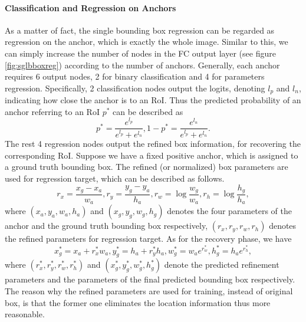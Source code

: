 \paragraph{Classification and Regression on Anchors}
As a matter of fact, the single bounding box regression can be regarded as regression on the anchor, which is exactly the whole image. Similar to this, we can simply increase the number of nodes in the FC output layer (see figure \ref{fig:sglbboxreg}) according to the number of anchors. Generally, each anchor requires 6 output nodes, 2 for binary classification and 4 for parameters regression. Specifically, 2 classification nodes output the logits, denoting $l_p$ and $l_n$, indicating how close the anchor is to an RoI. Thus the predicted probability of an anchor referring to an RoI $p^*$ can be described as
\begin{equation}
	p^* = \frac{e^{l_p}}{e^{l_p} + e^{l_n}}, 1 - p^* = \frac{e^{l_n}}{e^{l_p} + e^{l_n}}.
\end{equation}
The rest 4 regression nodes output the refined box information, for recovering the corresponding RoI. Suppose we have a fixed positive anchor, which is assigned to a ground truth bounding box. The refined (or normalized) box parameters are used for regression target, which can be described as follows.
\begin{equation}
	r_x = \frac{x_g - x_a}{w_a}, r_y = \frac{y_g - y_a}{h_a}, r_w = \log\frac{w_g}{w_a}, r_h = \log\frac{h_g}{h_a},
\end{equation}
where $(x_a, y_a, w_a, h_a)$ and $(x_g, y_g, w_g, h_g)$ denotes the four parameters of the anchor and the ground truth bounding box respectively, $(r_x, r_y, r_w, r_h)$ denotes the refined parameters for regression target. As for the recovery phase, we have
\begin{equation}
	x_g^* = x_a + r_x^*w_a, y_g^* = h_a + r_y^*h_a, w_g^* = w_ae^{r_w^*}, h_g^* = h_ae^{r_h^*},
\end{equation}
where $(r_x^*, r_y^*, r_w^*, r_h^*)$ and $(x_g^*, y_g^*, w_g^*, h_g^*)$ denote the predicted refinement parameters and the parameters of the final predicted bounding box respectively. The reason why the refined parameters are used for training, instead of original box, is that the former one eliminates the location information thus more reasonable.



